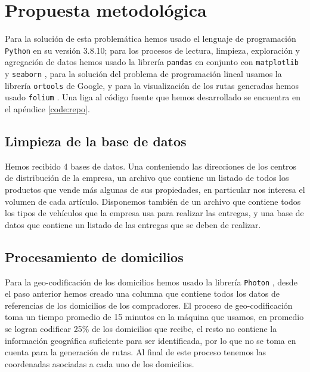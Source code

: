 \documentclass[journal]{IEEEtran}
\begin{document}
    \section{Propuesta metodológica} \label{sec:prop-method}
    
        Para la solución de esta problemática hemos usado el lenguaje de programación \texttt{Python} en su versión 3.8.10; para los procesos de lectura, limpieza, exploración y agregación de datos hemos usado la librería \texttt{pandas} \cite{mckinney-proc-scipy-2010} en conjunto con \texttt{matplotlib} \cite{Hunter:2007} y \texttt{seaborn} \cite{Waskom2021}, para la solución del problema de programación lineal usamos la librería \texttt{ortools} \cite{ortools} de Google, y para la visualización de los rutas generadas hemos usado \texttt{folium} \cite{folium}. Una liga al código fuente que hemos desarrollado se encuentra en el apéndice \ref{code:repo}.
        
        \subsection{Limpieza de la base de datos} \label{stage 1}
            
            Hemos recibido 4 bases de datos. Una conteniendo las direcciones de los centros de distribución de la empresa, un archivo que contiene un listado de todos los productos que vende más algunas de sus propiedades, en particular nos interesa el volumen de cada artículo. Disponemos también de un archivo que contiene todos los tipos de vehículos que la empresa usa para realizar las entregas, y una base de datos que contiene un listado de las entregas que se deben de realizar.
            
        \subsection{Procesamiento de domicilios} \label{stage 2}
        
            Para la geo-codificación de los domicilios hemos usado la librería \texttt{Photon} \cite{photon}, desde el paso anterior hemos creado una columna que contiene todos los datos de referencias de los domicilios de los compradores. El proceso de geo-codificación toma un tiempo promedio de 15 minutos en la máquina que usamos, en promedio se logran codificar 25\% de los domicilios que recibe, el resto no contiene la información geográfica suficiente para ser identificada, por lo que no se toma en cuenta para la generación de rutas. Al final de este proceso tenemos las coordenadas asociadas a cada uno de los domicilios.
\end{document}
